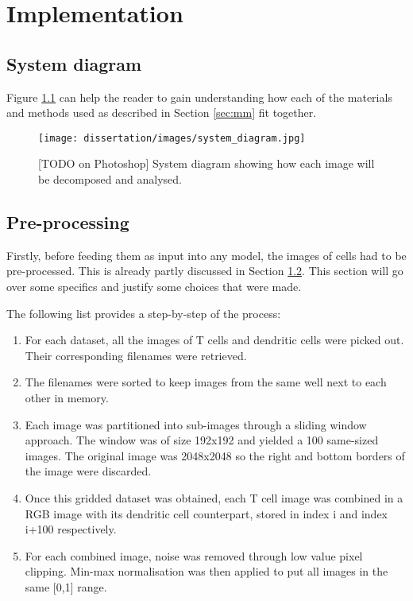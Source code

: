 

\chapter{Implementation} \label{sec:implementation}

\section{System diagram}

Figure \ref{fig:system} can help the reader to gain understanding how each of the materials and methods used as described in Section \ref{sec:mm} fit together.

\begin{figure}[h!]
    \centering
    \texttt{[image: dissertation/images/system\_diagram.jpg]}
    \caption{[TODO on Photoshop] System diagram showing how each image will be decomposed and analysed.}
    \label{fig:system}
\end{figure}

\section{Pre-processing}

Firstly, before feeding them as input into any model, the images of cells had to be pre-processed. This is already partly discussed in Section \ref{}. This section will go over some specifics and justify some choices that were made.

\bigskip 
The following list provides a step-by-step of the process:
\begin{enumerate}
    \item For each dataset, all the images of T cells and dendritic cells were picked out. Their corresponding filenames were retrieved.
    \item The filenames were sorted to keep images from the same well next to each other in memory.
    \item Each image was partitioned into sub-images through a sliding window approach. The window was of size 192x192 and yielded a 100 same-sized images. The original image was 2048x2048 so the right and bottom borders of the image were discarded.
    \item Once this gridded dataset was obtained, each T cell image was combined in a RGB image with its dendritic cell counterpart, stored in index i and index i+100 respectively. 
    \item For each combined image, noise was removed through low value pixel clipping. Min-max normalisation was then applied to put all images in the same [0,1] range.
\end{enumerate}

